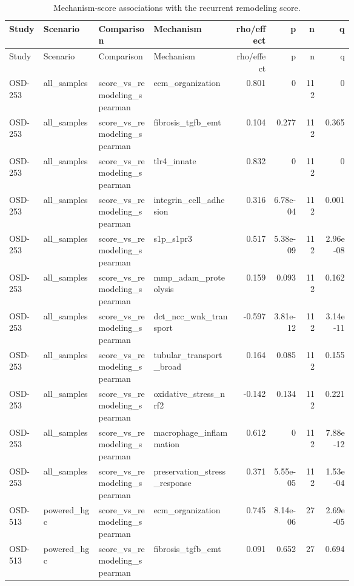 \documentclass[11pt]{article}
\begin{document}
\begin{landscape}
\scriptsize
\setlength{\tabcolsep}{3pt}
\begin{longtable}{p{0.10\linewidth}p{0.16\linewidth}p{0.16\linewidth}p{0.24\linewidth}rrrr}
\caption{Mechanism-score associations with the recurrent remodeling score.}\\
\toprule
Study & Scenario & Comparison & Mechanism & rho/effect & p & n & q \\
\midrule
\endfirsthead
\toprule
Study & Scenario & Comparison & Mechanism & rho/effect & p & n & q \\
\midrule
\endhead
OSD-253 & all\_samples & score\_vs\_remodeling\_spearman & ecm\_organization & 0.801 & 0 & 112 & 0 \\
OSD-253 & all\_samples & score\_vs\_remodeling\_spearman & fibrosis\_tgfb\_emt & 0.104 & 0.277 & 112 & 0.365 \\
OSD-253 & all\_samples & score\_vs\_remodeling\_spearman & tlr4\_innate & 0.832 & 0 & 112 & 0 \\
OSD-253 & all\_samples & score\_vs\_remodeling\_spearman & integrin\_cell\_adhesion & 0.316 & 6.78e-04 & 112 & 0.001 \\
OSD-253 & all\_samples & score\_vs\_remodeling\_spearman & s1p\_s1pr3 & 0.517 & 5.38e-09 & 112 & 2.96e-08 \\
OSD-253 & all\_samples & score\_vs\_remodeling\_spearman & mmp\_adam\_proteolysis & 0.159 & 0.093 & 112 & 0.162 \\
OSD-253 & all\_samples & score\_vs\_remodeling\_spearman & dct\_ncc\_wnk\_transport & -0.597 & 3.81e-12 & 112 & 3.14e-11 \\
OSD-253 & all\_samples & score\_vs\_remodeling\_spearman & tubular\_transport\_broad & 0.164 & 0.085 & 112 & 0.155 \\
OSD-253 & all\_samples & score\_vs\_remodeling\_spearman & oxidative\_stress\_nrf2 & -0.142 & 0.134 & 112 & 0.221 \\
OSD-253 & all\_samples & score\_vs\_remodeling\_spearman & macrophage\_inflammation & 0.612 & 0 & 112 & 7.88e-12 \\
OSD-253 & all\_samples & score\_vs\_remodeling\_spearman & preservation\_stress\_response & 0.371 & 5.55e-05 & 112 & 1.53e-04 \\
OSD-513 & powered\_hgc & score\_vs\_remodeling\_spearman & ecm\_organization & 0.745 & 8.14e-06 & 27 & 2.69e-05 \\
OSD-513 & powered\_hgc & score\_vs\_remodeling\_spearman & fibrosis\_tgfb\_emt & 0.091 & 0.652 & 27 & 0.694 \\

\end{longtable}
\end{landscape}
\end{document}
